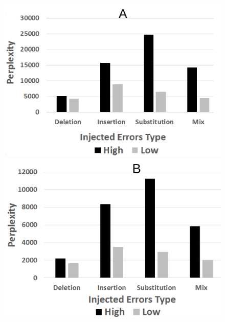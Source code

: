 \begin{figure}[t] \label{figure:Synthetic_Errors_Detection}
\begin{minipage}[t]{1.0\textwidth}
\begin{minipage}[t]{.24\textwidth}
\centering
  \includegraphics[width=\linewidth]{figs/Synth_NG_12.pdf}
\end{minipage}%
\begin{minipage}[t]{.24\textwidth}
\centering
\includegraphics[width=\linewidth]{figs/Synth_NG_3.pdf}
\end{minipage}%
\begin{minipage}[t]{.24\textwidth}
\centering

\end{minipage}
\end{minipage}
\end{figure}
